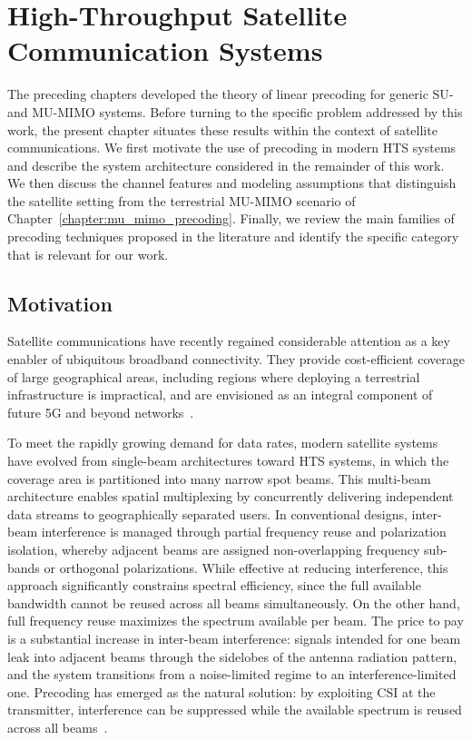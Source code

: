 \chapter{High-Throughput Satellite Communication Systems}
\label{chapter:hts_communication_systems}

The preceding chapters developed the theory of linear precoding for generic \ac{SU}- and \ac{MU}-\ac{MIMO} systems. Before turning to the specific problem addressed by this work, the present chapter situates these results within the context of satellite communications.
We first motivate the use of precoding in modern \acf{HTS} systems and describe the system architecture considered in the remainder of this work. We then discuss the channel features and modeling assumptions that distinguish the satellite setting from the terrestrial \ac{MU}-\ac{MIMO} scenario of Chapter~\ref{chapter:mu_mimo_precoding}. Finally, we review the main families of precoding techniques proposed in the literature and identify the specific category that is relevant for our work.


\section{Motivation}
\label{section:hts_motivation}

Satellite communications have recently regained considerable attention as a key enabler of ubiquitous broadband connectivity. 
They provide cost-efficient coverage of large geographical areas, including regions where deploying a terrestrial infrastructure is impractical, and are envisioned as an integral component of future 5G and beyond networks~\cite{1_signal_processing_for_satellites, 6_satellites_in_new_space_era}.

To meet the rapidly growing demand for data rates, modern satellite systems have evolved from single-beam architectures toward \acf{HTS} systems, in which the coverage area is partitioned into many narrow spot beams. 
This multi-beam architecture enables spatial multiplexing by concurrently delivering independent data streams to geographically separated users.
In conventional designs, inter-beam interference is managed through partial frequency reuse and polarization isolation, whereby adjacent beams are assigned non-overlapping frequency sub-bands or orthogonal polarizations.
While effective at reducing interference, this approach significantly constrains spectral efficiency, since the full available bandwidth cannot be reused across all beams simultaneously.
On the other hand, full frequency reuse maximizes the spectrum available per beam. The price to pay is a substantial increase in inter-beam interference: signals intended for one beam leak into adjacent beams through the sidelobes of the antenna radiation pattern, and the system transitions from a noise-limited regime to an interference-limited one.
Precoding has emerged as the natural solution: by exploiting \ac{CSI} at the transmitter, interference can be suppressed while the available spectrum is reused across all beams~\cite{1_signal_processing_for_satellites}.


